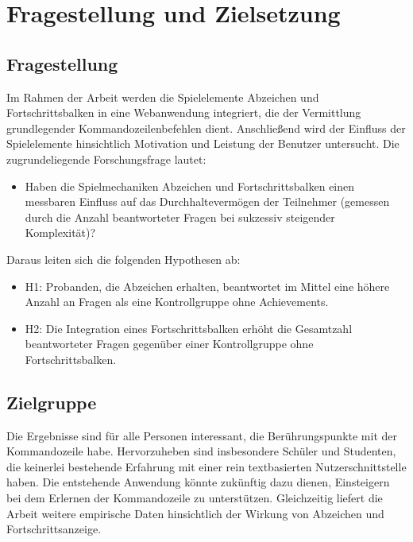 \documentclass[
    a4paper,
    doc,
    12pt,
    natbib,
]{apa6}
\begin{document}
\newpage

\section{Fragestellung und Zielsetzung}

\subsection{Fragestellung}
Im Rahmen der Arbeit werden die Spielelemente Abzeichen und Fortschrittsbalken in eine Webanwendung integriert, die der Vermittlung grundlegender Kommandozeilenbefehlen dient.
Anschließend wird der Einfluss der Spielelemente hinsichtlich Motivation und Leistung der Benutzer untersucht.
Die zugrundeliegende Forschungsfrage lautet:

\begin{itemize}
\item Haben die Spielmechaniken Abzeichen und Fortschrittsbalken einen messbaren Einfluss auf das Durchhaltevermögen der Teilnehmer (gemessen durch die Anzahl beantworteter Fragen bei sukzessiv steigender Komplexität)?
\end{itemize}


Daraus leiten sich die folgenden Hypothesen ab:

\begin{itemize}
\item H1: Probanden, die Abzeichen erhalten, beantwortet im Mittel eine höhere Anzahl an
Fragen als eine Kontrollgruppe ohne Achievements.
\item H2: Die Integration eines Fortschrittsbalken erhöht die Gesamtzahl beantworteter Fragen gegenüber einer Kontrollgruppe ohne Fortschrittsbalken.
\end{itemize}

\subsection{Zielgruppe}
Die Ergebnisse sind für alle Personen interessant, die Berührungspunkte mit der Kommandozeile habe.
Hervorzuheben sind insbesondere Schüler und Studenten, die keinerlei bestehende Erfahrung mit einer rein textbasierten Nutzerschnittstelle haben.
Die entstehende Anwendung könnte zukünftig dazu dienen, Einsteigern bei dem Erlernen der Kommandozeile zu unterstützen.
Gleichzeitig liefert die Arbeit weitere empirische Daten hinsichtlich der Wirkung von Abzeichen und Fortschrittsanzeige.
\end{document}
